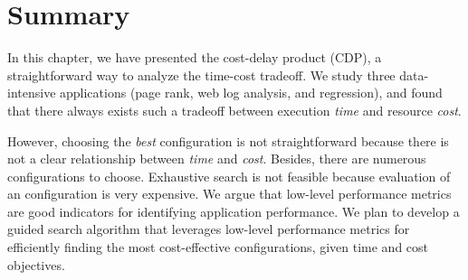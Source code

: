 \section{Summary}
\label{sec:conclusion}

In this chapter, we have presented the cost-delay product (CDP),
a straightforward way to analyze the time-cost tradeoff.
We study three data-intensive applications
(page rank, web log analysis, and regression), and
found that there always exists such a tradeoff between
execution \emph{time} and resource \emph{cost}.

However, choosing the \emph{best} configuration is not straightforward because
there is not a clear relationship between \emph{time} and \emph{cost}.
Besides, there are numerous configurations to choose.
Exhaustive search is not feasible because evaluation of an configuration
is very expensive.
We argue that low-level performance metrics are good indicators
for identifying application performance.
We plan to develop a guided search algorithm that leverages
low-level performance metrics
for efficiently finding the most cost-effective configurations,
given time and cost objectives.
